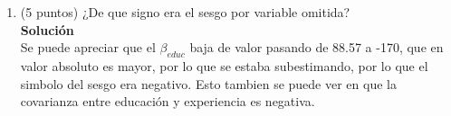 \documentclass[10pt,a4paper]{article}
\begin{document}
\begin{enumerate}
\begin{enumerate}
\[\begin{aligned}
\begin{pmatrix}
      1800 \\
2300 \\
2400 \\
2500 \\
3000 \\
 2600\\
   \end{pmatrix}                                                 \\[10pt]
X^{\top}y    &=
   \begin{pmatrix}
      14600 \\ 79200 \\ 64400
   \end{pmatrix}.
\end{aligned}
\]
Por lo que $\beta$ es:
\[
\begin{aligned}
\beta 
   &= 
\begin{pmatrix}
119.4 & -9.1 & -15.8 \\
-9.1 & 0.7 & 1.2 \\
-15.8 & 1.2 & 2.1
\end{pmatrix}
   \begin{pmatrix}
      14700 \\ 79600 \\ 64900
   \end{pmatrix}.                                              \\[10pt]
\beta &=
   \begin{pmatrix}
      5000 \\ -140 \\ -400
   \end{pmatrix}.
\end{aligned}
\]
    \item (5 puntos) ¿De que signo era el sesgo por variable omitida?
    \\
    \textbf{Solución}
    \\
    Se puede apreciar que el $\beta_{educ}$ baja de valor pasando de 88.57 a -170, que en valor absoluto es mayor, por lo que se estaba subestimando, por lo que el simbolo del sesgo era negativo. Esto tambien se puede ver en que la covarianza entre educación y experiencia es negativa.
\end{enumerate}

\end{enumerate}
\end{document}

